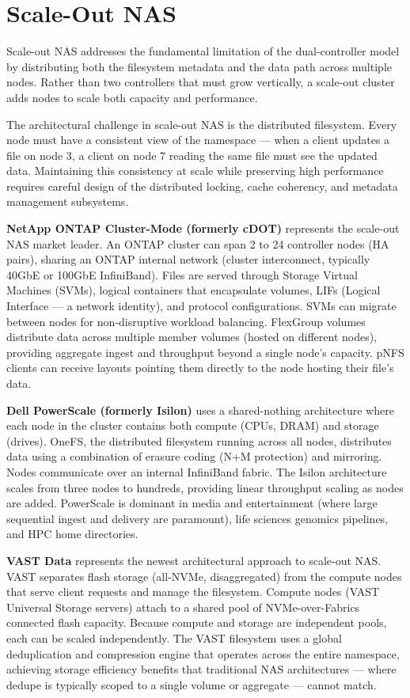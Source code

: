 \section{Scale-Out NAS}
Scale-out NAS addresses the fundamental limitation of the dual-controller model by distributing both the filesystem metadata and the data path across multiple nodes. Rather than two controllers that must grow vertically, a scale-out cluster adds nodes to scale both capacity and performance.

The architectural challenge in scale-out NAS is the distributed filesystem. Every node must have a consistent view of the namespace --- when a client updates a file on node 3, a client on node 7 reading the same file must see the updated data. Maintaining this consistency at scale while preserving high performance requires careful design of the distributed locking, cache coherency, and metadata management subsystems.

\textbf{NetApp ONTAP Cluster-Mode (formerly cDOT)} represents the scale-out NAS market leader. An ONTAP cluster can span 2 to 24 controller nodes (HA pairs), sharing an ONTAP internal network (cluster interconnect, typically 40GbE or 100GbE InfiniBand). Files are served through Storage Virtual Machines (SVMs), logical containers that encapsulate volumes, LIFs (Logical Interface --- a network identity), and protocol configurations. SVMs can migrate between nodes for non-disruptive workload balancing. FlexGroup volumes distribute data across multiple member volumes (hosted on different nodes), providing aggregate ingest and throughput beyond a single node's capacity. pNFS clients can receive layouts pointing them directly to the node hosting their file's data.

\textbf{Dell PowerScale (formerly Isilon)} uses a shared-nothing architecture where each node in the cluster contains both compute (CPUs, DRAM) and storage (drives). OneFS, the distributed filesystem running across all nodes, distributes data using a combination of erasure coding (N+M protection) and mirroring. Nodes communicate over an internal InfiniBand fabric. The Isilon architecture scales from three nodes to hundreds, providing linear throughput scaling as nodes are added. PowerScale is dominant in media and entertainment (where large sequential ingest and delivery are paramount), life sciences genomics pipelines, and HPC home directories.

\textbf{VAST Data} represents the newest architectural approach to scale-out NAS. VAST separates flash storage (all-NVMe, disaggregated) from the compute nodes that serve client requests and manage the filesystem. Compute nodes (VAST Universal Storage servers) attach to a shared pool of NVMe-over-Fabrics connected flash capacity. Because compute and storage are independent pools, each can be scaled independently. The VAST filesystem uses a global deduplication and compression engine that operates across the entire namespace, achieving storage efficiency benefits that traditional NAS architectures --- where dedupe is typically scoped to a single volume or aggregate --- cannot match.

